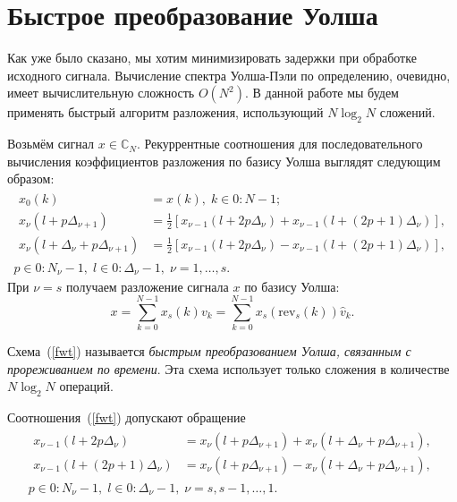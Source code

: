 \documentclass{matmex-diploma-custom}
\begin{document}
\section{Быстрое преобразование Уолша}
Как уже было сказано, мы хотим минимизировать задержки при обработке 
исходного сигнала.
Вычисление спектра Уолша-Пэли по определению, очевидно, имеет вычислительную 
сложность $O(N^2)$. В данной работе мы будем применять быстрый алгоритм
разложения, использующий $N \log_2 N$ сложений.

Возьмём сигнал $x \in \mathbb{C}_N$. Рекуррентные соотношения для 
последовательного вычисления коэффициентов разложения по базису Уолша
выглядят следующим образом:
\begin{gather}
\begin{split}
\label{fwt}
x_0 (k) &= x(k), \; k \in 0:N-1; \\
x_\nu (l + p \Delta_{\nu + 1}) &= 
\frac{1}{2} [ x_{\nu - 1} (l + 2 p \Delta_\nu) + x_{\nu - 1} (l + (2 p + 1) \Delta_\nu) ], \\
x_\nu (l + \Delta_\nu + p \Delta_{\nu + 1}) &= 
\frac{1}{2} [ x_{\nu - 1} (l + 2 p \Delta_\nu) - x_{\nu - 1} (l + (2 p +1) \Delta_\nu) ], 
\end{split}
\\
p \in 0:N_\nu - 1, \; l \in 0:\Delta_\nu - 1, \; \nu = 1, \ldots, s. \nonumber
\end{gather}
При $\nu = s$ получаем разложение сигнала $x$ по базису Уолша:
\begin{equation}
\label{fwtWalsh}
  x 
  = \sum_{k=0}^{N-1} x_s(k) v_k 
  = \sum_{k=0}^{N-1} x_s(\mathrm{rev}_s(k)) \hat{v}_k.
\end{equation}


Схема~(\ref{fwt}) называется \emph{быстрым преобразованием Уолша, связанным с 
прореживанием по времени}. Эта схема использует только 
сложения в количестве $N\log_2 N$ операций.

Соотношения~(\ref{fwt}) допускают обращение
\begin{gather}
\begin{split}
\label{revfwt}
x_{\nu - 1} (l + 2 p \Delta_\nu) &=
x_\nu (l + p \Delta_{\nu + 1}) + x_\nu (l + \Delta_\nu + p \Delta_{\nu + 1}), \\
x_{\nu - 1} (l + (2 p + 1) \Delta_\nu) &=
x_\nu (l + p \Delta_{\nu + 1}) - x_\nu (l + \Delta_\nu + p \Delta_{\nu + 1}),
\end{split}
\\
p \in 0:N_\nu - 1, \; l \in 0:\Delta_\nu - 1, \; \nu = s, s-1, \ldots, 1. \nonumber
\end{gather}
\end{document}
